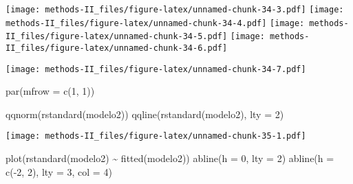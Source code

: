 \documentclass[
]{article}
\newenvironment{Shaded}{\begin{snugshade}}{\end{snugshade}}
\newcommand{\AttributeTok}[1]{\textcolor[rgb]{0.77,0.63,0.00}{#1}}
\newcommand{\CommentTok}[1]{\textcolor[rgb]{0.56,0.35,0.01}{\textit{#1}}}
\newcommand{\DecValTok}[1]{\textcolor[rgb]{0.00,0.00,0.81}{#1}}
\newcommand{\FunctionTok}[1]{\textcolor[rgb]{0.00,0.00,0.00}{#1}}
\newcommand{\NormalTok}[1]{#1}
\newcommand{\SpecialCharTok}[1]{\textcolor[rgb]{0.00,0.00,0.00}{#1}}
\begin{document}
\texttt{[image: methods-II\_files/figure-latex/unnamed-chunk-34-3.pdf]}
\texttt{[image: methods-II\_files/figure-latex/unnamed-chunk-34-4.pdf]}
\texttt{[image: methods-II\_files/figure-latex/unnamed-chunk-34-5.pdf]}
\texttt{[image: methods-II\_files/figure-latex/unnamed-chunk-34-6.pdf]}

\begin{Shaded}
\end{Shaded}

\texttt{[image: methods-II\_files/figure-latex/unnamed-chunk-34-7.pdf]}

\begin{Shaded}
\begin{Highlighting}[]
\FunctionTok{par}\NormalTok{(}\AttributeTok{mfrow =} \FunctionTok{c}\NormalTok{(}\DecValTok{1}\NormalTok{, }\DecValTok{1}\NormalTok{))}
\end{Highlighting}
\end{Shaded}

\begin{Shaded}
\begin{Highlighting}[]
\FunctionTok{qqnorm}\NormalTok{(}\FunctionTok{rstandard}\NormalTok{(modelo2))}
\FunctionTok{qqline}\NormalTok{(}\FunctionTok{rstandard}\NormalTok{(modelo2), }\AttributeTok{lty =} \DecValTok{2}\NormalTok{)}
\end{Highlighting}
\end{Shaded}

\texttt{[image: methods-II\_files/figure-latex/unnamed-chunk-35-1.pdf]}

\begin{Shaded}
\begin{Highlighting}[]
\FunctionTok{plot}\NormalTok{(}\FunctionTok{rstandard}\NormalTok{(modelo2) }\SpecialCharTok{\textasciitilde{}} \FunctionTok{fitted}\NormalTok{(modelo2))}
\FunctionTok{abline}\NormalTok{(}\AttributeTok{h =} \DecValTok{0}\NormalTok{, }\AttributeTok{lty =} \DecValTok{2}\NormalTok{)}
\FunctionTok{abline}\NormalTok{(}\AttributeTok{h =} \FunctionTok{c}\NormalTok{(}\SpecialCharTok{{-}}\DecValTok{2}\NormalTok{, }\DecValTok{2}\NormalTok{), }\AttributeTok{lty =} \DecValTok{3}\NormalTok{, }\AttributeTok{col =} \DecValTok{4}\NormalTok{)}
\end{Highlighting}
\end{Shaded}
\end{document}

